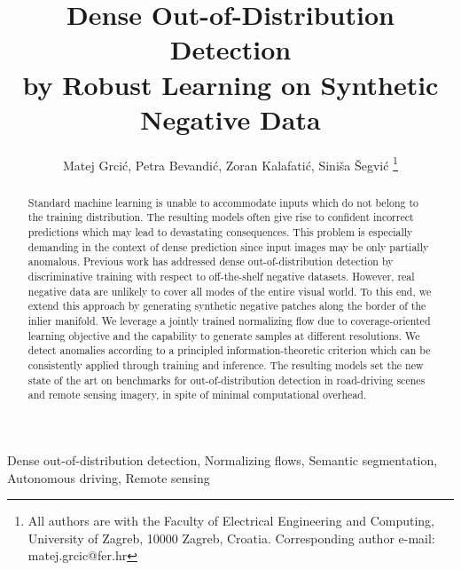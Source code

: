\documentclass[lettersize,journal,hidelinks]{IEEEtran}
\begin{document}
\title{Dense Out-of-Distribution Detection \\ by Robust Learning  on Synthetic Negative Data}

\author{Matej Grcić, Petra Bevandić, Zoran Kalafatić, Siniša Šegvić
\thanks{All authors are with the Faculty of Electrical Engineering and Computing, University of Zagreb, 10000 Zagreb, Croatia. Corresponding author e-mail: matej.grcic@fer.hr}
}




\maketitle

\begin{abstract}
Standard machine learning is unable to accommodate inputs which do not belong to the training distribution. 
The resulting models often give rise to confident incorrect predictions which may lead to devastating consequences.
This problem is especially demanding in the context of dense prediction since input images may be only partially anomalous. Previous work has addressed dense out-of-distribution detection by discriminative training with respect to 
off-the-shelf negative datasets.
However, real negative data are unlikely to cover
all modes of the entire visual world.
To this end, we extend this approach by generating synthetic negative patches along the border of the inlier manifold.
We leverage a jointly trained normalizing flow due to coverage-oriented learning objective and the capability to generate samples at different resolutions. 
We detect anomalies according to a principled information-theoretic criterion which can be consistently applied through training and inference. 
The resulting models set the new state of the art on benchmarks for out-of-distribution detection in road-driving scenes and remote sensing imagery, in spite of minimal computational overhead.
\end{abstract}

\begin{IEEEkeywords}
Dense out-of-distribution detection, Normalizing flows, Semantic segmentation, Autonomous driving, Remote sensing
\end{IEEEkeywords}
\end{document}
